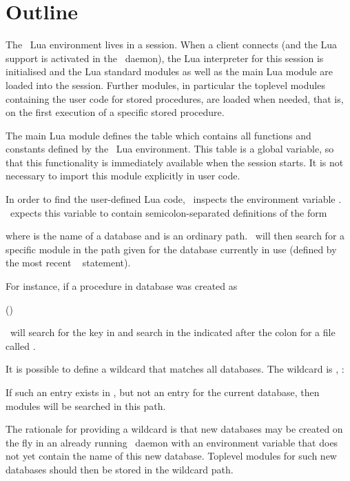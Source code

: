 \section{Outline}
The \nowdb\ Lua environment lives in a session.
When a client connects
(and the Lua support
is activated in the \nowdb\ daemon),
the Lua interpreter for this session is initialised
and the Lua standard modules 
as well as the main Lua module are loaded
into the session.
Further modules, in particular the toplevel modules
containing the user code for stored procedures,
are loaded when needed, that is, on the first
execution of a specific stored procedure.

The main Lua module defines the table 
 which contains all
functions and constants defined by
the \nowdb\ Lua environment.
This table is a global variable,
so that this functionality is immediately available
when the session starts.
It is not necessary to import this module explicitly
in user code.

In order to find the user-defined Lua code,
\nowdb\ inspects the environment variable
. \nowdb\ expects
this variable to contain
semicolon-separated definitions of the form


where  is the name of a database and
 is an ordinary  path.
\nowdb\ will then search for a specific module
in the path given for the database currently
in use (defined by the most recent
\sql\  statement).

For instance, if a procedure in database 
was created as

 ()
 

\nowdb\ will search for the key  in
 and search in the 
indicated after the colon for a file called
.

It is possible to define a wildcard that matches all databases.
The wildcard is \tech{*}, \eg:


If such an entry exists 
in ,
but not an entry for the current database,
then modules will be searched in this path.

The rationale for providing a wildcard is that
new databases may be created on the fly in an already
running \nowdb\ daemon with an environment variable
that does not yet contain the name of this new database.
Toplevel modules for such new databases
should then be stored in the wildcard path.

